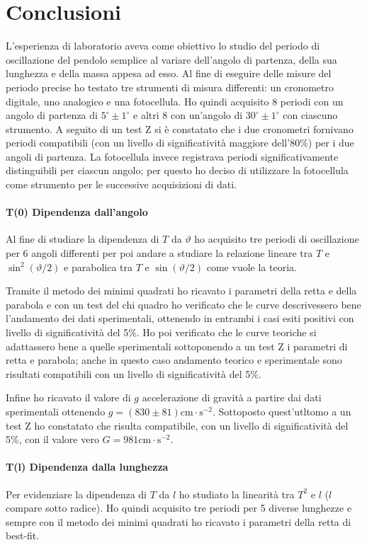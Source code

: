 \documentclass{article}
\begin{document}
	\section{Conclusioni}
	L'esperienza di laboratorio aveva come obiettivo lo studio del periodo di oscillazione del pendolo semplice al variare dell'angolo di partenza, della sua lunghezza e della massa appesa ad esso. Al fine di eseguire delle misure del periodo precise ho testato tre strumenti di misura differenti: un cronometro digitale, uno analogico e una fotocellula. Ho quindi acquisito 8 periodi con un angolo di partenza di $5^\circ \pm 1^\circ$ e altri 8 con un'angolo di $30^\circ \pm 1^\circ$ con ciascuno strumento. A seguito di un test Z si è constatato che i due cronometri fornivano periodi compatibili (con un livello di significatività maggiore dell'80\%) per i due angoli di partenza. La fotocellula invece registrava periodi significativamente distinguibili per ciascun angolo; per questo ho deciso di utilizzare la fotocellula come strumento per le successive acquisizioni di dati.
	
	\paragraph{T(0) Dipendenza dall'angolo}
	Al fine di studiare la dipendenza di $T$ da $\vartheta$ ho acquisito tre periodi di oscillazione per 6 angoli differenti per poi andare a studiare la relazione lineare tra $T$ e $\sin^2(\vartheta/2)$ e parabolica tra $T$ e $\sin(\vartheta/2)$ come vuole la teoria.
	
	Tramite il metodo dei minimi quadrati ho ricavato i parametri della retta e della parabola e con un test del chi quadro ho verificato che le curve descrivessero bene l'andamento dei dati sperimentali, ottenendo in entrambi i casi esiti positivi con livello di significatività del 5\%. Ho poi verificato che le curve teoriche si adattassero bene a quelle sperimentali sottoponendo a un test Z i parametri di retta e parabola; anche in questo caso andamento teorico e sperimentale sono risultati compatibili con un livello di significatività del 5\%.
	
	Infine ho ricavato il valore di $g$ accelerazione di gravità a partire dai dati sperimentali ottenendo 	$g = (830 \pm 81)\text{cm}\cdot \text{s}^{-2}$. Sottoposto quest'utltomo a un test Z ho constatato che risulta compatibile,  con un livello di significatività del 5\%, con il valore vero $G = 981\text{cm}\cdot \text{s}^{-2}$.
	
	\paragraph{T(l) Dipendenza dalla lunghezza}	
	Per evidenziare la dipendenza di $T$ da $l$ ho studiato la linearità tra $T^2$ e $l$ ($l$ compare sotto radice). Ho quindi acquisito tre periodi per 5 diverse lunghezze e sempre con il metodo dei minimi quadrati ho ricavato i parametri della retta di best-fit. 
	
\end{document}
